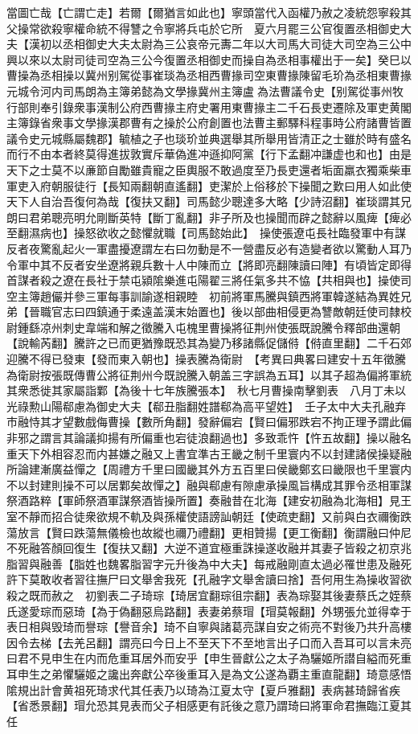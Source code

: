 當圖亡哉【亡謂亡走】若爾【爾猶言如此也】寧頭當代入函權乃赦之凌統怨寧殺其父操常欲殺寧權命統不得讐之令寧將兵屯於它所　夏六月罷三公官復置丞相御史大夫【漢初以丞相御史大夫太尉為三公哀帝元夀二年以大司馬大司徒大司空為三公中興以來以太尉司徒司空為三公今復置丞相御史而操自為丞相事權出于一矣】癸巳以曹操為丞相操以冀州别駕從事崔琰為丞相西曹掾司空東曹掾陳留毛玠為丞相東曹掾元城令河内司馬朗為主簿弟懿為文學掾冀州主簿盧為法曹議令史【别駕從事州牧行部則奉引錄衆事漢制公府西曹掾主府史署用東曹掾主二千石長吏遷除及軍吏黄閣主簿錄省衆事文學掾漢郡曹有之操於公府創置也法曹主郵驛科程事時公府諸曹皆置議令史元城縣屬魏郡】毓植之子也琰玠並典選舉其所舉用皆清正之士雖於時有盛名而行不由本者終莫得進拔敦實斥華偽進冲遜抑阿黨【行下孟翻冲謙虚也和也】由是天下之士莫不以亷節自勵雖貴寵之臣輿服不敢過度至乃長吏還者垢面羸衣獨乘柴車軍吏入府朝服徒行【長知兩翻朝直遙翻】吏潔於上俗移於下操聞之歎曰用人如此使天下人自治吾復何為哉【復扶又翻】司馬懿少聰達多大略【少詩沼翻】崔琰謂其兄朗曰君弟聰亮明允剛斷英特【斷丁亂翻】非子所及也操聞而辟之懿辭以風痺【痺必至翻濕病也】操怒欲收之懿懼就職【司馬懿始此】　操使張遼屯長社臨發軍中有謀反者夜驚亂起火一軍盡擾遼謂左右曰勿動是不一營盡反必有造變者欲以驚動人耳乃令軍中其不反者安坐遼將親兵數十人中陳而立【將即亮翻陳讀曰陣】有頃皆定即得首謀者殺之遼在長社于禁屯潁隂樂進屯陽翟三將任氣多共不恊【共相與也】操使司空主簿趙儼并參三軍每事訓諭遂相親睦　初前將軍馬騰與鎮西將軍韓遂結為異姓兄弟【晉職官志曰四鎮通于柔遠盖漢末始置也】後以部曲相侵更為讐敵朝廷使司隸校尉鍾繇凉州刺史韋端和解之徵騰入屯槐里曹操將征荆州使張既說騰令釋部曲還朝【說輸芮翻】騰許之已而更猶豫既恐其為變乃移諸縣促儲偫【偫直里翻】二千石郊迎騰不得已發東【發而東入朝也】操表騰為衛尉　【考異曰典畧曰建安十五年徵騰為衛尉按張既傳曹公將征荆州今既說騰入朝盖三字誤為五耳】以其子超為偏將軍統其衆悉徙其家屬詣鄴【為後十七年族騰張本】　秋七月曹操南擊劉表　八月丁未以光祿勲山陽郗慮為御史大夫【郗丑脂翻姓譜郗為高平望姓】　壬子太中大夫孔融弃市融恃其才望數戲侮曹操【數所角翻】發辭偏宕【賢曰偏邪跌宕不拘正理予謂此偏非邪之謂言其論議抑揚有所偏重也宕徒浪翻過也】多致乖忤【忤五故翻】操以融名重天下外相容忍而内甚嫌之融又上書宜準古王畿之制千里寰内不以封建諸侯操疑融所論建漸廣益憚之【周禮方千里曰國畿其外方五百里曰侯畿鄭玄曰畿限也千里寰内不以封建則操不可以居鄴矣故憚之】融與郗慮有隙慮承操風旨構成其罪令丞相軍謀祭酒路粹【軍師祭酒軍謀祭酒皆操所置】奏融昔在北海【建安初融為北海相】見王室不靜而招合徒衆欲規不軌及與孫權使語謗訕朝廷【使疏吏翻】又前與白衣禰衡跌蕩放言【賢曰跌蕩無儀檢也故縱也禰乃禮翻】更相贊揚【更工衡翻】衡謂融曰仲尼不死融答顏回復生【復扶又翻】大逆不道宜極重誅操遂收融并其妻子皆殺之初京兆脂習與融善【脂姓也魏畧脂習字元升後為中大夫】每戒融剛直太過必罹世患及融死許下莫敢收者習往撫尸曰文舉舍我死【孔融字文舉舍讀曰捨】吾何用生為操收習欲殺之既而赦之　初劉表二子琦琮【琦居宜翻琮徂宗翻】表為琮娶其後妻蔡氏之姪蔡氏遂愛琮而惡琦【為于偽翻惡烏路翻】表妻弟蔡瑁【瑁莫報翻】外甥張允並得幸于表日相與毁琦而譽琮【譽音余】琦不自寧與諸葛亮謀自安之術亮不對後乃共升高樓因令去梯【去羌呂翻】謂亮曰今日上不至天下不至地言出子口而入吾耳可以言未亮曰君不見申生在内而危重耳居外而安乎【申生晉獻公之太子為驪姬所譛自縊而死重耳申生之弟懼驪姬之讒出奔獻公卒後重耳入是為文公遂為覇主重直龍翻】琦意感悟隂規出計會黄祖死琦求代其任表乃以琦為江夏太守【夏戶雅翻】表病甚琦歸省疾【省悉景翻】瑁允恐其見表而父子相感更有託後之意乃謂琦曰將軍命君撫臨江夏其任